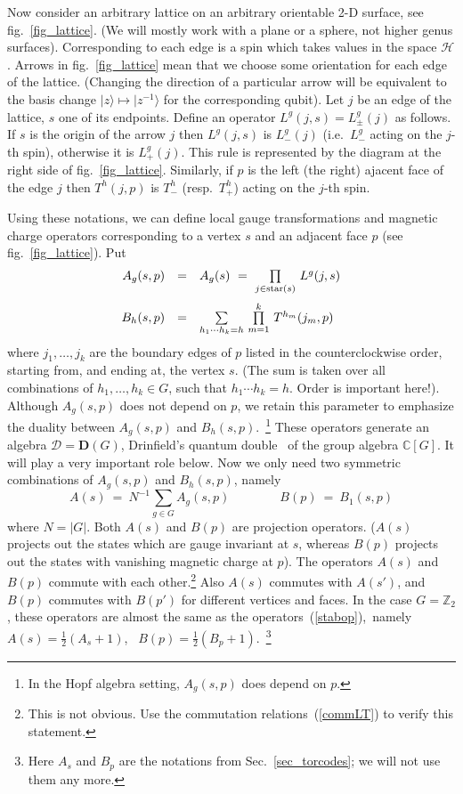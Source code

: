 \documentclass[12pt]{article}
\newcommand{\Z}{\mathbb{Z}}
\newcommand{\C}{\mathbb{C}}
\newcommand{\D}{\mathbf{D}}
\newcommand{\calD}{\mathcal{D}}
\newcommand{\calH}{\mathcal{H}}
\begin{document}
Now consider an arbitrary lattice on an arbitrary orientable 2-D surface, see
fig.~\ref{fig_lattice}. (We will mostly work with a plane or a sphere, not
higher genus surfaces). Corresponding to each edge is a spin which takes
values in the space $\calH$. Arrows in fig.~\ref{fig_lattice} mean that we
choose some orientation for each edge of the lattice. (Changing the direction
of a particular arrow will be equivalent to the basis change
$|z\rangle\mapsto|z^{-1}\rangle$ for the corresponding qubit). Let $j$ be an
edge of the lattice, $s$ one of its endpoints. Define an operator
$L^g(j,s)=L_\pm^g(j)$ as follows. If $s$ is the origin of the arrow $j$ then
$L^g(j,s)$ is $L_-^g(j)$ (i.e.\ $L_-^g$ acting on the $j$-th spin), otherwise
it is $L_+^g(j)$.  This rule is represented by the diagram at the right side
of fig.~\ref{fig_lattice}. Similarly, if $p$ is the left (the right) ajacent
face of the edge $j$ then $T^h(j,p)$ is $T_-^h$ (resp.\ $T_+^h$) acting on the
$j$-th spin.

Using these notations, we can define local gauge transformations and magnetic 
charge operators corresponding to a vertex $s$ and an adjacent face $p$ 
(see fig.~\ref{fig_lattice}). Put
\begin{equation} \label{locop}
  \begin{array}{rcl}
    A_g(s,p)&=& A_g(s)\ =\ 
    \prod\limits_{j\in\mbox{\scriptsize star}(s)}\,L^g(j,s) \medskip \\ 
    B_h(s,p) &=& 
    \sum\limits_{h_{1}\cdots h_{k}=h}\, \prod\limits_{m=1}^{k}\,T^{h_m}(j_m,p)
  \end{array}
\end{equation}
where $j_1,\ldots,j_k$ are the boundary edges of $p$ listed in the 
counterclockwise order, starting from, and ending at, the vertex $s$. 
(The sum is taken over all combinations of $h_1,\ldots,h_k\in G$, such that 
$h_1\cdots h_k=h$. Order is important here!). Although $A_g(s,p)$ does not 
depend on $p$, we retain this parameter to emphasize the duality between
$A_g(s,p)$ and $B_h(s,p)$.~\footnote{
  In the Hopf algebra setting, $A_g(s,p)$ does depend on $p$.}
These operators generate an algebra $\calD=\D(G)$, Drinfield's quantum 
double~\cite{Drin} of the group algebra $\C[G]$. It will play a very 
important role below. Now we only need two symmetric combinations of 
$A_g(s,p)$ and $B_h(s,p)$, namely
\begin{equation}
  A(s)\ =\ N^{-1} \sum_{g\in G} A_g(s,p) \qquad\qquad
  B(p)\ =\ B_1(s,p)
\end{equation}
where $N=|G|$. Both $A(s)$ and $B(p)$ are projection operators. ($A(s)$ 
projects out the states which are gauge invariant at $s$, whereas $B(p)$ 
projects out the states with vanishing magnetic charge at $p$).
The operators $A(s)$ and $B(p)$ commute with each other.\footnote{
 This is not obvious. Use the commutation relations~(\ref{commLT}) to verify 
 this statement.} 
Also $A(s)$ commutes with $A(s')$, and $B(p)$ commutes with $B(p')$ for 
different vertices and faces. In the case $G=\Z_2$, these operators are
almost the same as the operators~(\ref{stabop}),\, namely\,\, 
$A(s)=\frac{1}{2}(A_s+1)$,\,\,\, $B(p)=\frac{1}{2}(B_p+1)$.~\footnote{
 Here $A_s$ and $B_p$ are the notations from Sec.~\ref{sec_torcodes}; 
 we will not use them any more.}
\end{document}

